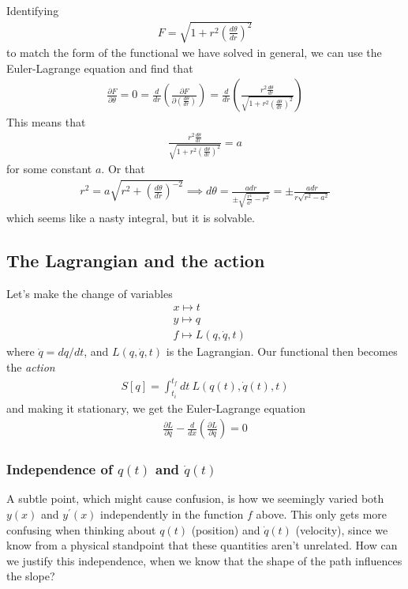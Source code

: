 \documentclass[a4paper]{article}
\begin{document}
    Identifying
    \begin{align*}
        F = \sqrt{1 + r^{2} \left( \frac{d \theta }{d r} \right)^{2}} 
    \end{align*}
    to match the form of the functional we have solved in general, we can use the Euler-Lagrange equation and find that \begin{align*}
        \frac{\partial F}{\partial \theta } = 0 = \frac{d}{dr }\left( \frac{\partial F}{\partial \left( \frac{d \theta }{dr} \right) }  \right) = \frac{d}{d r }\left( \frac{r^{2} \frac{d \theta }{dr}}{\sqrt{1 + r^{2} \left( \frac{d \theta }{dr} \right)^{2}}}\right)
    \end{align*}
    This means that \begin{align*}
        \frac{r^{2} \frac{d \theta }{dr}}{\sqrt{1 + r^{2} \left( \frac{d \theta }{dr} \right)^{2}}} = a
    \end{align*}
    for some constant \(a\). Or that \begin{align*}
        r^{2} = a \sqrt{r^{2} + \left(\frac{d \theta }{dr} \right)^{-2}}  \implies  d \theta = \frac{a dr}{\pm \sqrt{\frac{r^4}{a^{2}} - r^{2}}} = \pm \frac{a dr}{r\sqrt{r^2 - a^{2}}}
    \end{align*}
    which seems like a nasty integral, but it is solvable.

    \subsection{The Lagrangian and the action}
    Let's make the change of variables \begin{align*}
        &x \mapsto t\\
        &y \mapsto q\\
        &f \mapsto L(q, \dot{q}, t)
    \end{align*}
    where \(\dot{q} = dq / dt\), and \(L(q, \dot{q}, t)\) is the Lagrangian. Our functional then becomes the \textit{action} \begin{align*}
        S[q] = \int_{t_i}^{t_f} dt\ L(q(t), \dot{q} (t), t)
    \end{align*} and making it stationary, we get the Euler-Lagrange equation \begin{align*}
        \frac{\partial L}{\partial q}- \frac{d}{dx}\left( \frac{\partial L}{\partial \dot{q}}\right) = 0
    \end{align*} 

    \subsubsection{Independence of \(q(t)\) and \(\dot{q}(t)\)}
    A subtle point, which might cause confusion, is how we seemingly varied both \(y(x)\) and \(y^{\prime}(x)\) independently in the function \(f\) above. This only gets more confusing when thinking about \(q(t)\) (position) and \(\dot{q} (t)\) (velocity), since we know from a physical standpoint that these quantities aren't unrelated. How can we justify this independence, when we know that the shape of the path influences the slope?
\end{document}
